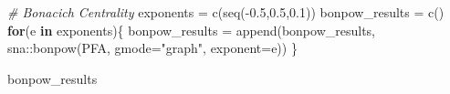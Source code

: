 \documentclass[
  notitlepage,
  onecolumn,
  openany]{book}
\newenvironment{Shaded}{\begin{snugshade}}{\end{snugshade}}
\newcommand{\AttributeTok}[1]{\textcolor[rgb]{0.77,0.63,0.00}{#1}}
\newcommand{\CommentTok}[1]{\textcolor[rgb]{0.56,0.35,0.01}{\textit{#1}}}
\newcommand{\ControlFlowTok}[1]{\textcolor[rgb]{0.13,0.29,0.53}{\textbf{#1}}}
\newcommand{\FloatTok}[1]{\textcolor[rgb]{0.00,0.00,0.81}{#1}}
\newcommand{\FunctionTok}[1]{\textcolor[rgb]{0.00,0.00,0.00}{#1}}
\newcommand{\NormalTok}[1]{#1}
\newcommand{\OtherTok}[1]{\textcolor[rgb]{0.56,0.35,0.01}{#1}}
\newcommand{\SpecialCharTok}[1]{\textcolor[rgb]{0.00,0.00,0.00}{#1}}
\newcommand{\StringTok}[1]{\textcolor[rgb]{0.31,0.60,0.02}{#1}}
\begin{document}
\begin{Shaded}
\begin{Highlighting}[]
\CommentTok{\# Bonacich Centrality}
\NormalTok{exponents }\OtherTok{=} \FunctionTok{c}\NormalTok{(}\FunctionTok{seq}\NormalTok{(}\SpecialCharTok{{-}}\FloatTok{0.5}\NormalTok{,}\FloatTok{0.5}\NormalTok{,}\FloatTok{0.1}\NormalTok{))}
\NormalTok{bonpow\_results }\OtherTok{=} \FunctionTok{c}\NormalTok{()}
\ControlFlowTok{for}\NormalTok{(e }\ControlFlowTok{in}\NormalTok{ exponents)\{}
\NormalTok{   bonpow\_results }\OtherTok{=} \FunctionTok{append}\NormalTok{(bonpow\_results,}
\NormalTok{                           sna}\SpecialCharTok{::}\FunctionTok{bonpow}\NormalTok{(PFA, }\AttributeTok{gmode=}\StringTok{"graph"}\NormalTok{, }\AttributeTok{exponent=}\NormalTok{e))}
\NormalTok{\}}

\NormalTok{bonpow\_results}
\end{Highlighting}
\end{Shaded}
\end{document}
